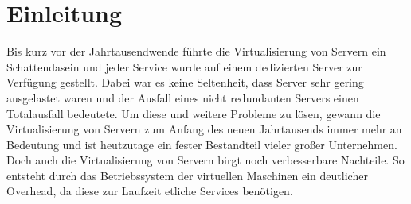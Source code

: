 \section{Einleitung}
\label{sec:Einleitung}

Bis kurz vor der Jahrtausendwende führte die Virtualisierung von Servern ein Schattendasein und jeder Service wurde auf einem dedizierten Server zur Verfügung gestellt. Dabei war es keine Seltenheit, dass Server sehr gering ausgelastet waren und der Ausfall eines nicht redundanten Servers einen Totalausfall bedeutete. Um diese und weitere Probleme zu lösen, gewann die Virtualisierung von Servern zum Anfang des neuen Jahrtausends immer mehr an Bedeutung und ist heutzutage ein fester Bestandteil vieler großer Unternehmen. Doch auch die Virtualisierung von Servern birgt noch verbesserbare Nachteile. So entsteht durch das Betriebssystem der virtuellen Maschinen ein deutlicher Overhead, da diese zur Laufzeit etliche Services benötigen.  